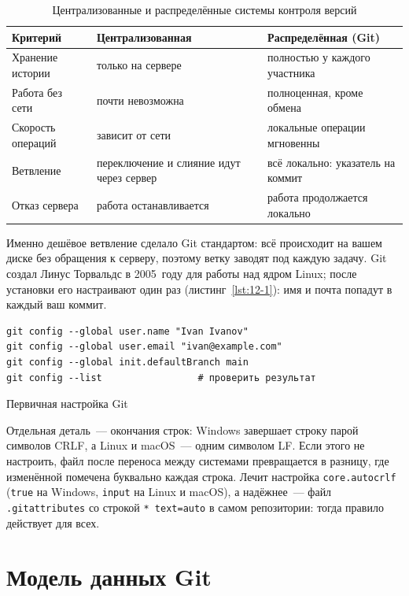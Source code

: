 \begin{table}[htbp]
\caption{Централизованные и распределённые системы контроля версий}
\label{tab:12-1}
\centering
\begin{tabular}{L{3.6cm}L{5.4cm}L{5.4cm}}
\toprule
Критерий & Централизованная & Распределённая (Git) \\
\midrule
Хранение истории & только на сервере & полностью у каждого участника \\
Работа без сети & почти невозможна & полноценная, кроме обмена \\
Скорость операций & зависит от сети & локальные операции мгновенны \\
Ветвление & переключение и слияние идут через сервер & всё локально: указатель на коммит \\
Отказ сервера & работа останавливается & работа продолжается локально \\
\bottomrule
\end{tabular}
\end{table}

Именно дешёвое ветвление сделало Git стандартом: всё происходит на вашем диске без обращения к серверу, поэтому ветку заводят под каждую задачу. Git создал Линус Торвальдс в 2005~году для работы над ядром Linux; после установки его настраивают один раз (листинг~\ref{lst:12-1}): имя и почта попадут в каждый ваш коммит.

\begin{listing}[H]
\begin{verbatim}
git config --global user.name "Ivan Ivanov"
git config --global user.email "ivan@example.com"
git config --global init.defaultBranch main
git config --list                 # проверить результат
\end{verbatim}
\caption{Первичная настройка Git}
\label{lst:12-1}
\end{listing}

Отдельная деталь~--- окончания строк: Windows завершает строку парой символов CRLF, а Linux и macOS~--- одним символом LF. Если этого не настроить, файл после переноса между системами превращается в разницу, где изменённой помечена буквально каждая строка. Лечит настройка \texttt{core.autocrlf} (\texttt{true} на Windows, \texttt{input} на Linux и macOS), а надёжнее~--- файл \texttt{.gitattributes} со строкой \texttt{* text=auto} в самом репозитории: тогда правило действует для всех.

\section{Модель данных Git}

